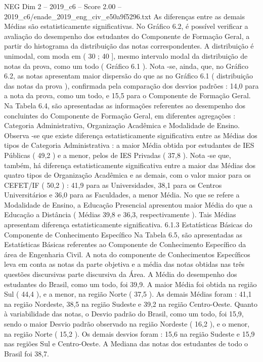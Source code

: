\begin{textsample}{NEG Dim 2 – 2019\_c6 – Score 2.00 – 2019\_c6/enade\_2019\_eng\_civ\_e50a9f5296.txt}
As diferenças entre as demais Médias são estatisticamente significativas.
No Gráfico 6.2, é possível verificar a avaliação do desempenho dos estudantes do Componente de Formação Geral, a partir do histograma da distribuição das notas correspondentes.
A distribuição é unimodal, com moda em ( 30 ; 40 ], mesmo intervalo modal da distribuição de notas da prova, como um todo ( Gráfico 6.1 ).
Nota -se, ainda, que, no Gráfico 6.2, as notas apresentam maior dispersão do que as no Gráfico 6.1 ( distribuição das notas da prova ), confirmada pela comparação dos desvios padrões : 14,0 para a nota da prova, como um todo, e 15,5 para o Componente de Formação Geral.
Na Tabela 6.4, são apresentadas as informações referentes ao desempenho dos concluintes do Componente de Formação Geral, em diferentes agregações : Categoria Administrativa, Organização Acadêmica e Modalidade de Ensino.
Observa -se que existe diferença estatisticamente significativa entre as Médias dos tipos de Categoria Administrativa : a maior Média obtida por estudantes de IES Públicas ( 49,2 ) e a menor, pelos de IES Privadas ( 37,8 ).
Nota -se que, também, há diferença estatisticamente significativa entre a maior das Médias dos quatro tipos de Organização Acadêmica e as demais, com o valor maior para os CEFET/IF ( 50,2 ) : 41,9 para as Universidades, 38,1 para os Centros Universitários e 36,0 para as Faculdades, a menor Média.
No que se refere a Modalidade de Ensino, a Educação Presencial apresentou maior Média do que a Educação a Distância ( Médias 39,8 e 36,3, respectivamente ).
Tais Médias apresentam diferença estatisticamente significativa. 6.1.3 Estatísticas Básicas do Componente de Conhecimento Específico Na Tabela 6.5, são apresentadas as Estatísticas Básicas referentes ao Componente de Conhecimento Específico da área de Engenharia Civil.
A nota do componente de Conhecimentos Específicos leva em conta as notas da parte objetiva e a média das notas obtidas nas três questões discursivas parte discursiva da Área.
A Média do desempenho dos estudantes do Brasil, como um todo, foi 39,9.
A maior Média foi obtida na região Sul ( 44,4 ), e a menor, na região Norte ( 37,5 ).
As demais Médias foram : 41,1 na região Nordeste, 38,5 na região Sudeste e 39,2 na região Centro-Oeste.
Quanto à variabilidade das notas, o Desvio padrão do Brasil, como um todo, foi 15,9, sendo o maior Desvio padrão observado na região Nordeste ( 16,2 ), e o menor, na região Norte ( 15,2 ).
Os demais desvios foram : 15,6 na região Sudeste e 15,9 nas regiões Sul e Centro-Oeste.
A Mediana das notas dos estudantes de todo o Brasil foi 38,7.

\end{textsample}
